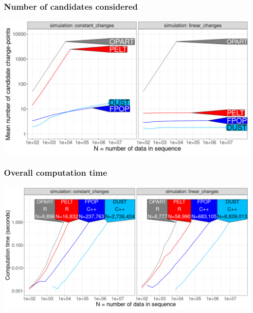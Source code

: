 \documentclass{beamer}
\begin{document}
\begin{frame}
  \frametitle{Number of candidates considered}
  \includegraphics[width=\textwidth]{figure-pred-candidates.png}
\end{frame}

\begin{frame}
  \frametitle{Overall computation time}
  \includegraphics[width=\textwidth]{figure-pred-seconds.png}
\end{frame}
\end{document}
